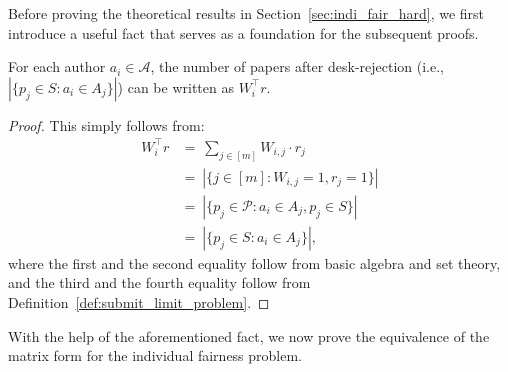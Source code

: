 Before proving the theoretical results in Section~\ref{sec:indi_fair_hard}, we first introduce a useful fact that serves as a foundation for the subsequent proofs.   

\begin{fact}\label{fact:author_paper_count}
For each author $a_i\in\mathcal{A}$, the number of papers after desk-rejection (i.e., $|\{p_j \in  S : a_i \in A_j\}|$) can be written as $W_i^\top r$.
\end{fact}
\begin{proof}
    This simply follows from:
    \begin{align*}
        W^\top_ir &=~ \sum_{j\in[m]} W_{i,j}\cdot r_j \\ 
        &=~ |\{j\in[m]:W_{i, j}=1,r_j=1\}| \\ 
        &=~ |\{p_j\in\mathcal{P}:a_i\in A_j, p_j\in S\}| \\ 
        &=~|\{p_j \in  S : a_i \in A_j\}|,
    \end{align*}
where the first and the second equality follow from basic algebra and set theory, and the third and the fourth equality follow from Definition~\ref{def:submit_limit_problem}.  
\end{proof}

With the help of the aforementioned fact, we now prove the equivalence of the matrix form for the individual fairness problem.


